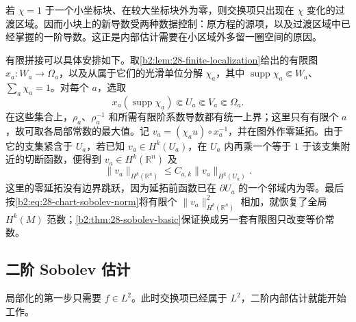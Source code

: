 若 \(\chi=1\) 于一个小坐标块、在较大坐标块外为零，则交换项只出现在 \(\chi\) 变化的过渡区域。因而小块上的新导数受两种数据控制：原方程的源项，以及过渡区域中已经掌握的一阶导数。这正是内部估计需要在小区域外多留一圈空间的原因。

有限拼接可以具体安排如下。取\cref{b2:lem:28-finite-localization}给出的有限图 \(x_a:W_a\to\Omega_a\)，以及从属于它们的光滑单位分解 \(\chi_a\)，其中
\(\operatorname{supp}\chi_a\Subset W_a\)、\(\sum_a\chi_a=1\)。对每个 \(a\)，选取
\begin{equation}\label{b2:eq:28-nested-coordinate-sets}
 x_a(\operatorname{supp}\chi_a)\Subset U_a\Subset V_a\Subset\Omega_a.
\end{equation}
在这些集合上，\(\rho_a\)、\(\rho_a^{-1}\) 和所需有限阶系数导数都有统一上界；这里只有有限个 \(a\)，故可取各局部常数的最大值。记
\(v_a=(\chi_a u)\circ x_a^{-1}\)，并在图外作零延拓。由于它的支集紧含于 \(U_a\)，若已知 \(v_a\in H^k(U_a)\)，在 \(U_a\) 内再乘一个等于 \(1\) 于该支集附近的切断函数，便得到 \(v_a\in H^k(\mathbb R^n)\) 及
\[
 \|v_a\|_{H^k(\mathbb R^n)}\leq C_{a,k}\|v_a\|_{H^k(U_a)}.
\]
这里的零延拓没有边界跳跃，因为延拓前函数已在 \(\partial U_a\) 的一个邻域内为零。最后按\eqref{b2:eq:28-chart-sobolev-norm}将有限个 \(\|v_a\|_{H^k(\mathbb R^n)}^2\) 相加，就恢复了全局 \(H^k(M)\) 范数；\cref{b2:thm:28-sobolev-basic}保证换成另一套有限图只改变等价常数。

\subsection{二阶 Sobolev 估计}
\label{b2:subsec:260402}

局部化的第一步只需要 \(f\in L^2\)。此时交换项已经属于 \(L^2\)，二阶内部估计就能开始工作。

